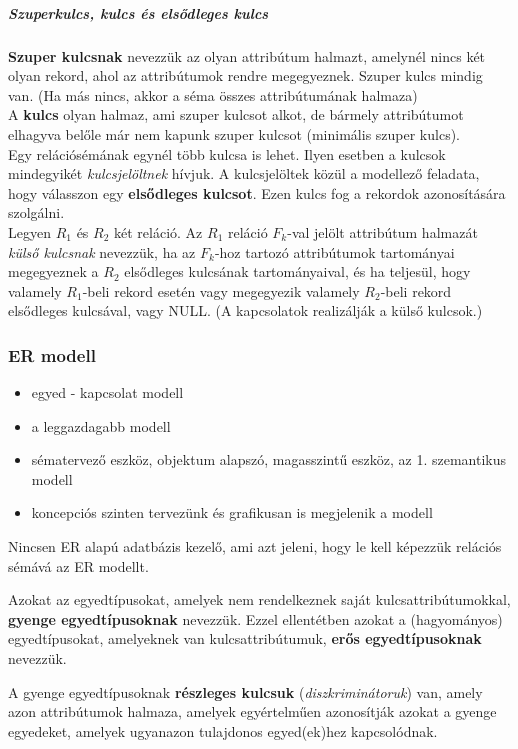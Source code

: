 \subparagraph{Szuperkulcs, kulcs és elsődleges kulcs} 
\textbf{Szuper kulcsnak} nevezzük az olyan attribútum halmazt, amelynél nincs két olyan rekord, ahol az attribútumok rendre megegyeznek. Szuper kulcs mindig van. (Ha más nincs, akkor a séma összes attribútumának halmaza)\\
A \textbf{kulcs} olyan halmaz, ami szuper kulcsot alkot, de bármely attribútumot elhagyva belőle már nem kapunk szuper kulcsot (minimális szuper kulcs).\\
Egy relációsémának egynél több kulcsa is lehet. Ilyen esetben a kulcsok mindegyikét \emph{kulcsjelöltnek} hívjuk. A kulcsjelöltek közül a modellező feladata, hogy válasszon egy \textbf{elsődleges kulcsot}. Ezen kulcs fog a rekordok azonosítására szolgálni.\\
Legyen $R_1$ és $R_2$ két reláció. Az $R_1$ reláció $F_k$-val jelölt attribútum halmazát \emph{külső kulcsnak} nevezzük, ha az $F_k$-hoz tartozó attribútumok tartományai megegyeznek a $R_2$ elsődleges kulcsának tartományaival, és ha teljesül, hogy valamely $R_1$-beli rekord esetén vagy megegyezik valamely $R_2$-beli rekord elsődleges kulcsával, vagy NULL. (A kapcsolatok realizálják a külső kulcsok.)

\subsubsection{ER modell}
\begin{itemize}[nosep]
	\item egyed - kapcsolat modell
	\item a leggazdagabb modell
	\item sématervező eszköz, objektum alapszó, magasszintű eszköz, az 1. szemantikus modell
	\item koncepciós szinten tervezünk és grafikusan is megjelenik a modell
\end{itemize}
\begin{note}
Nincsen ER alapú adatbázis kezelő, ami azt jeleni, hogy le kell képezzük relációs sémává az ER modellt.
\end{note}
\begin{definition}[Egyedtípusok]
	Azokat az egyedtípusokat, amelyek nem rendelkeznek saját kulcsattribútumokkal, \textbf{gyenge egyedtípusoknak} nevezzük. Ezzel ellentétben azokat a (hagyományos) egyedtípusokat, 	amelyeknek van kulcsattribútumuk, \textbf{erős egyedtípusoknak} nevezzük.
\end{definition}
\begin{definition}
	A gyenge egyedtípusoknak \textbf{részleges kulcsuk} (\emph{diszkriminátoruk}) van, amely azon attribútumok halmaza, amelyek egyértelműen azonosítják azokat a gyenge egyedeket, amelyek ugyanazon tulajdonos egyed(ek)hez kapcsolódnak.
\end{definition}

